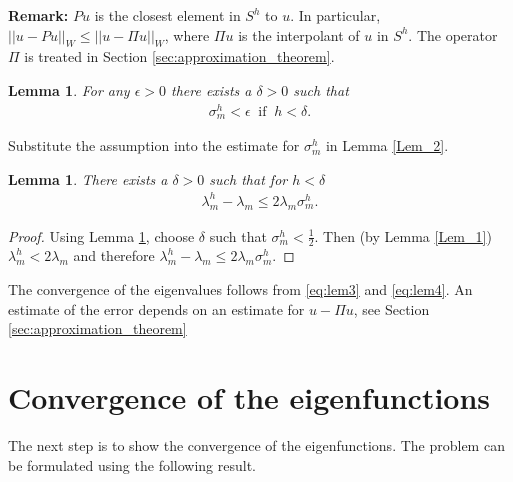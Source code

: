 \documentclass[../../main.tex]{subfiles}
\begin{document}
\textbf{Remark:} $Pu$ is the closest element in $S^h$ to $u$. In particular, $||u-Pu||_{W}\leq ||u-\Pi u||_{W}$, where $\Pi u$ is the interpolant of $u$ in $S^h$. The operator $\Pi$ is treated in Section \ref{sec:approximation_theorem}.
	
\newtheorem{Lem_3}[Lem_1]{Lemma} 
\begin{Lem_3}
	\label{Lem_3}
	For any $\epsilon >0$ there exists a $\delta > 0$ such that
	\begin{eqnarray}
	\sigma_{m}^{h} < \epsilon \ \textrm{ if } \ h < \delta. \label{eq:lem3}
	\end{eqnarray}
\end{Lem_3}

Substitute the assumption into the estimate for $\sigma^h_m$ in Lemma \ref{Lem_2}.

\newtheorem{Lem_4}[Lem_1]{Lemma} 
\begin{Lem_4}
	\label{Lem_4}
	There exists a $\delta > 0$ such that for $h < \delta$
	\begin{eqnarray}
	\lambda_{m}^{h} - \lambda_{m} \leq 2\lambda_{m}\sigma_{m}^{h}. \label{eq:lem4}
	\end{eqnarray}
\end{Lem_4}
\begin{proof}
	Using Lemma \ref{Lem_3}, choose $\delta$ such that $\sigma_{m}^{h} < \frac{1}{2}$. Then (by Lemma \ref{Lem_1}) $\lambda_{m}^{h} < 2\lambda_{m}$ and therefore $\lambda_{m}^{h} - \lambda_{m} \leq 2\lambda_{m}\sigma_{m}^{h}$.
\end{proof}

The convergence of the eigenvalues follows from \eqref{eq:lem3} and \eqref{eq:lem4}. An estimate of the error depends on an estimate for $u - \Pi u$, see Section \ref{sec:approximation_theorem}

\section{Convergence of the eigenfunctions}
The next step is to show the convergence of the eigenfunctions. The problem can be formulated using the following result.
\end{document}

